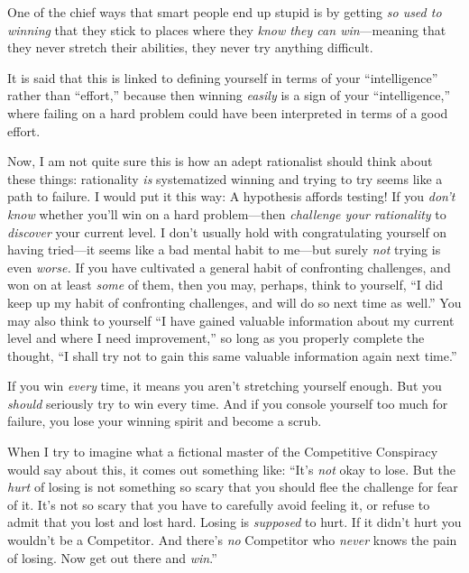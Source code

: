 {
 One of the chief ways that smart people end up stupid is by
getting \textit{so used to winning} that they stick to places where
they \textit{know they can win}{}---meaning that they never stretch
their abilities, they never try anything difficult.}

{
 It is said that this is linked to defining yourself in terms of
your ``intelligence'' rather than
``effort,'' because then winning
\textit{easily} is a sign of your
``intelligence,'' where failing on a
hard problem could have been interpreted in terms of a good effort.}

{
 Now, I am not quite sure this is how an adept rationalist should
think about these things: rationality \textit{is} systematized winning
and trying to try seems like a path to failure. I would put it this
way: A hypothesis affords testing! If you \textit{don't
know} whether you'll win on a hard problem---then
\textit{challenge your rationality} to \textit{discover} your current
level. I don't usually hold with congratulating
yourself on having tried---it seems like a bad mental habit to me---but
surely \textit{not} trying is even \textit{worse.} If you have
cultivated a general habit of confronting challenges, and won on at
least \textit{some} of them, then you may, perhaps, think to yourself,
``I did keep up my habit of confronting challenges,
and will do so next time as well.'' You may also
think to yourself ``I have gained valuable information
about my current level and where I need
improvement,'' so long as you properly complete the
thought, ``I shall try not to gain this same valuable
information again next time.''}

{
 If you win \textit{every} time, it means you
aren't stretching yourself enough. But you
\textit{should} seriously try to win every time. And if you console
yourself too much for failure, you lose your winning spirit and become
a scrub.}

{
 When I try to imagine what a fictional master of the Competitive
Conspiracy would say about this, it comes out something like:
``It's \textit{not} okay to lose. But
the \textit{hurt} of losing is not something so scary that you should
flee the challenge for fear of it. It's not so scary
that you have to carefully avoid feeling it, or refuse to admit that
you lost and lost hard. Losing is \textit{supposed} to hurt. If it
didn't hurt you wouldn't be a
Competitor. And there's \textit{no} Competitor who
\textit{never} knows the pain of losing. Now get out there and
\textit{win}.''}

